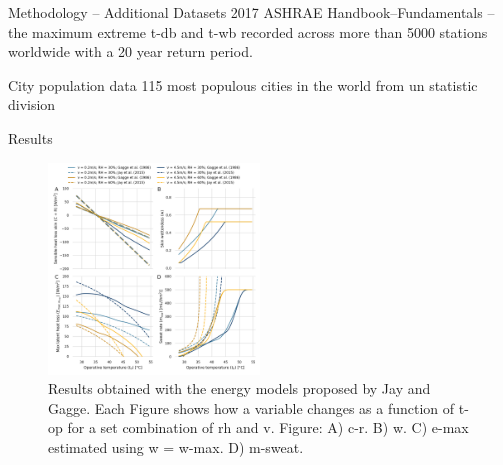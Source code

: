 \documentclass[aspectratio=169]{beamer}
\begin{document}
    \begin{frame}{Methodology -- Additional Datasets}
        2017 ASHRAE Handbook--Fundamentals -- the maximum extreme \ac{t-db} and \ac{t-wb} recorded across more than 5000 stations worldwide with a 20 year return period.

        City population data 115 most populous cities in the world from \ac{un} statistic division~\cite{UNdatare88:online}
    \end{frame}

    \begin{frame}{Results}
        \begin{figure}[thb!]
            \centering
            \includegraphics[width=0.5\textwidth]{figures/comparison_models_v2}
            \caption{Results obtained with the energy models proposed by Jay and Gagge.
            Each Figure shows how a variable changes as a function of \ac{t-op} for a set combination of \ac{rh} and \ac{v}.
            Figure: A) \Acf{c-r}.
            B) \Acf{w}.
            C) \Acf{e-max} estimated using \ac{w} = \ac{w-max}.
            D) \Acf{m-sweat}.}
            \label{fig:comparison_models}
        \end{figure}
    \end{frame}
\end{document}
